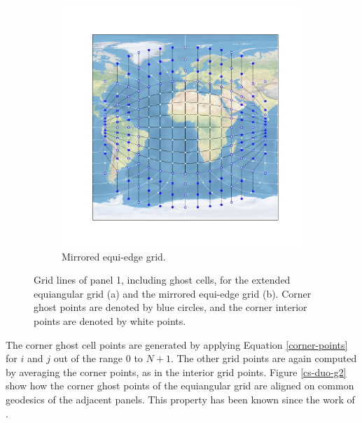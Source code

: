 \documentclass[preprint,12pt]{elsarticle}
\begin{document}
\begin{linenumbers}
\begin{figure}[!htb]
\begin{subfigure}{0.49\textwidth}
		\includegraphics[width=1.13\linewidth]{g0_duo2}
		\caption{Mirrored equi-edge grid.\label{cs-duo-g02}}
	\end{subfigure}
	\caption{Grid lines of panel 1, including ghost cells, for the extended equiangular grid (a) and the mirrored equi-edge grid (b).
		Corner ghost points are denoted by blue circles, and the corner interior points are denoted by white points.\label{cs-duo}}
\end{figure}

The corner ghost cell points are generated by applying Equation \eqref{corner-points} for $i$ and $j$ out of the range $0$ to $N+1$. 
The other grid points are again computed by averaging the corner points, as in the interior grid points.
Figure \ref{cs-duo-g2} show how the corner ghost points of the equiangular grid are aligned on common geodesics of the adjacent panels.
This property has been known since the work of \cite{ronchi:1996}.


\end{linenumbers}
\end{document}
